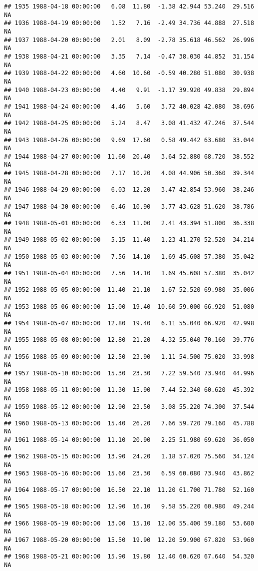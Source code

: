 \documentclass{article}\usepackage{graphicx, color}
\makeatletter
\newenvironment{kframe}{%
 \def\at@end@of@kframe{}%
 \ifinner\ifhmode%
  \def\at@end@of@kframe{\end{minipage}}%
  \begin{minipage}{\columnwidth}%
 \fi\fi%
 \def\FrameCommand##1{\hskip\@totalleftmargin \hskip-\fboxsep
 \colorbox{shadecolor}{##1}\hskip-\fboxsep
     \hskip-\linewidth \hskip-\@totalleftmargin \hskip\columnwidth}%
 \MakeFramed {\advance\hsize-\width
   \@totalleftmargin\z@ \linewidth\hsize
   \@setminipage}}%
 {\par\unskip\endMakeFramed%
 \at@end@of@kframe}
\newenvironment{knitrout}{}{} %
\makeatother
\begin{document}
\begin{knitrout}
\begin{kframe}
\begin{verbatim}
## 1935 1988-04-18 00:00:00   6.08  11.80  -1.38 42.944 53.240  29.516     NA
## 1936 1988-04-19 00:00:00   1.52   7.16  -2.49 34.736 44.888  27.518     NA
## 1937 1988-04-20 00:00:00   2.01   8.09  -2.78 35.618 46.562  26.996     NA
## 1938 1988-04-21 00:00:00   3.35   7.14  -0.47 38.030 44.852  31.154     NA
## 1939 1988-04-22 00:00:00   4.60  10.60  -0.59 40.280 51.080  30.938     NA
## 1940 1988-04-23 00:00:00   4.40   9.91  -1.17 39.920 49.838  29.894     NA
## 1941 1988-04-24 00:00:00   4.46   5.60   3.72 40.028 42.080  38.696     NA
## 1942 1988-04-25 00:00:00   5.24   8.47   3.08 41.432 47.246  37.544     NA
## 1943 1988-04-26 00:00:00   9.69  17.60   0.58 49.442 63.680  33.044     NA
## 1944 1988-04-27 00:00:00  11.60  20.40   3.64 52.880 68.720  38.552     NA
## 1945 1988-04-28 00:00:00   7.17  10.20   4.08 44.906 50.360  39.344     NA
## 1946 1988-04-29 00:00:00   6.03  12.20   3.47 42.854 53.960  38.246     NA
## 1947 1988-04-30 00:00:00   6.46  10.90   3.77 43.628 51.620  38.786     NA
## 1948 1988-05-01 00:00:00   6.33  11.00   2.41 43.394 51.800  36.338     NA
## 1949 1988-05-02 00:00:00   5.15  11.40   1.23 41.270 52.520  34.214     NA
## 1950 1988-05-03 00:00:00   7.56  14.10   1.69 45.608 57.380  35.042     NA
## 1951 1988-05-04 00:00:00   7.56  14.10   1.69 45.608 57.380  35.042     NA
## 1952 1988-05-05 00:00:00  11.40  21.10   1.67 52.520 69.980  35.006     NA
## 1953 1988-05-06 00:00:00  15.00  19.40  10.60 59.000 66.920  51.080     NA
## 1954 1988-05-07 00:00:00  12.80  19.40   6.11 55.040 66.920  42.998     NA
## 1955 1988-05-08 00:00:00  12.80  21.20   4.32 55.040 70.160  39.776     NA
## 1956 1988-05-09 00:00:00  12.50  23.90   1.11 54.500 75.020  33.998     NA
## 1957 1988-05-10 00:00:00  15.30  23.30   7.22 59.540 73.940  44.996     NA
## 1958 1988-05-11 00:00:00  11.30  15.90   7.44 52.340 60.620  45.392     NA
## 1959 1988-05-12 00:00:00  12.90  23.50   3.08 55.220 74.300  37.544     NA
## 1960 1988-05-13 00:00:00  15.40  26.20   7.66 59.720 79.160  45.788     NA
## 1961 1988-05-14 00:00:00  11.10  20.90   2.25 51.980 69.620  36.050     NA
## 1962 1988-05-15 00:00:00  13.90  24.20   1.18 57.020 75.560  34.124     NA
## 1963 1988-05-16 00:00:00  15.60  23.30   6.59 60.080 73.940  43.862     NA
## 1964 1988-05-17 00:00:00  16.50  22.10  11.20 61.700 71.780  52.160     NA
## 1965 1988-05-18 00:00:00  12.90  16.10   9.58 55.220 60.980  49.244     NA
## 1966 1988-05-19 00:00:00  13.00  15.10  12.00 55.400 59.180  53.600     NA
## 1967 1988-05-20 00:00:00  15.50  19.90  12.20 59.900 67.820  53.960     NA
## 1968 1988-05-21 00:00:00  15.90  19.80  12.40 60.620 67.640  54.320     NA

\end{verbatim}
\end{kframe}
\end{knitrout}
\end{document}
